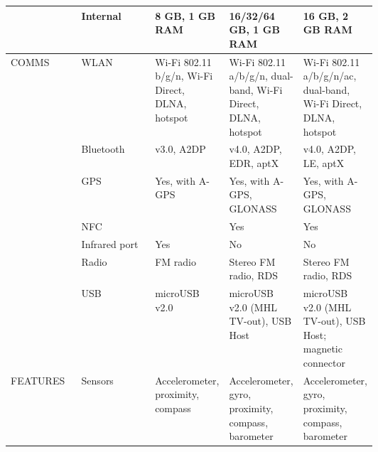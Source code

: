 \begin{longtable}{llp{0.2\linewidth}p{0.2\linewidth}p{0.2\linewidth}}
		& Internal      & 8 GB, 1 GB RAM                                  & 16/32/64 GB, 1 GB RAM                                                                       & 16 GB, 2 GB RAM                                                                                                \\ \hline
		COMMS    & WLAN          & Wi-Fi 802.11 b/g/n, Wi-Fi Direct, DLNA, hotspot & Wi-Fi 802.11 a/b/g/n, dual-band, Wi-Fi Direct, DLNA, hotspot                                & Wi-Fi 802.11 a/b/g/n/ac, dual-band, Wi-Fi Direct, DLNA, hotspot                                                \\
		& Bluetooth     & v3.0, A2DP                                      & v4.0, A2DP, EDR, aptX                                                                       & v4.0, A2DP, LE, aptX                                                                                           \\
		& GPS           & Yes, with A-GPS                                 & Yes, with A-GPS, GLONASS                                                                    & Yes, with A-GPS, GLONASS                                                                                       \\
		& NFC           &                                                 & Yes                                                                                         & Yes                                                                                                            \\
		& Infrared port & Yes                                             & No                                                                                          & No                                                                                                             \\
		& Radio         & FM radio                                        & Stereo FM radio, RDS                                                                        & Stereo FM radio, RDS                                                                                           \\
		& USB           & microUSB v2.0                                   & microUSB v2.0 (MHL TV-out), USB Host                                                        & microUSB v2.0 (MHL TV-out), USB Host; magnetic connector                                                       \\ \hline
		FEATURES & Sensors       & Accelerometer, proximity, compass               & Accelerometer, gyro, proximity, compass, barometer                                          & Accelerometer, gyro, proximity, compass, barometer                                                             \\ \hline

\end{longtable}
